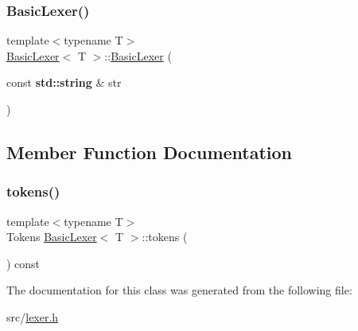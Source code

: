 \subsubsection{\texorpdfstring{Basic\+Lexer()}{BasicLexer()}\hspace{0.1cm}{\footnotesize\ttfamily [6/6]}}
{\footnotesize\ttfamily template$<$typename T$>$ \\
\hyperlink{class_basic_lexer}{Basic\+Lexer}$<$ T $>$\+::\hyperlink{class_basic_lexer}{Basic\+Lexer} (\begin{DoxyParamCaption}\item[{const \textbf{ std\+::string} \&}]{str }\end{DoxyParamCaption})\hspace{0.3cm}{\ttfamily [inline]}}



\subsection{Member Function Documentation}
\mbox{\label{class_basic_lexer_ac20fdf19d5602c563b5cad2bae3ad803}} 
\subsubsection{\texorpdfstring{tokens()}{tokens()}}
{\footnotesize\ttfamily template$<$typename T$>$ \\
Tokens \hyperlink{class_basic_lexer}{Basic\+Lexer}$<$ T $>$\+::tokens (\begin{DoxyParamCaption}{ }\end{DoxyParamCaption}) const\hspace{0.3cm}{\ttfamily [inline]}}



The documentation for this class was generated from the following file\+:\begin{DoxyCompactItemize}
\item 
src/\hyperlink{lexer_8h}{lexer.\+h}\end{DoxyCompactItemize}
